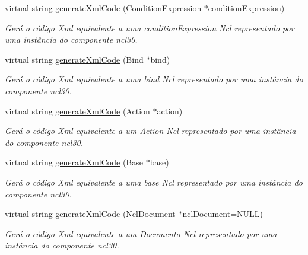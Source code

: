 \begin{DoxyCompactItemize}
virtual string \hyperlink{classbr_1_1ufscar_1_1lince_1_1ncl_1_1generator_1_1NclGenerator_a1c0a01534324eb9c5614b72391844cd5}{generateXmlCode} (ConditionExpression $\ast$conditionExpression)
\begin{DoxyCompactList}\small\item\em Gerá o código Xml equivalente a uma conditionExpression Ncl representado por uma instância do componente ncl30. \item\end{DoxyCompactList}\item 
virtual string \hyperlink{classbr_1_1ufscar_1_1lince_1_1ncl_1_1generator_1_1NclGenerator_abd146c724f44d5750a92979d8fe53b34}{generateXmlCode} (Bind $\ast$bind)
\begin{DoxyCompactList}\small\item\em Gerá o código Xml equivalente a uma bind Ncl representado por uma instância do componente ncl30. \item\end{DoxyCompactList}\item 
virtual string \hyperlink{classbr_1_1ufscar_1_1lince_1_1ncl_1_1generator_1_1NclGenerator_abc3c9219312ca8082cce41d6e1b5fc23}{generateXmlCode} (Action $\ast$action)
\begin{DoxyCompactList}\small\item\em Gerá o código Xml equivalente a um Action Ncl representado por uma instância do componente ncl30. \item\end{DoxyCompactList}\item 
virtual string \hyperlink{classbr_1_1ufscar_1_1lince_1_1ncl_1_1generator_1_1NclGenerator_aae7b4842e72b88deb5c5a303a77c7cab}{generateXmlCode} (Base $\ast$base)
\begin{DoxyCompactList}\small\item\em Gerá o código Xml equivalente a uma base Ncl representado por uma instância do componente ncl30. \item\end{DoxyCompactList}\item 
virtual string \hyperlink{classbr_1_1ufscar_1_1lince_1_1ncl_1_1generator_1_1NclGenerator_a1d6d619cdde5a146572c0f4a6beeae54}{generateXmlCode} (NclDocument $\ast$nclDocument=NULL)
\begin{DoxyCompactList}\small\item\em Gerá o código Xml equivalente a um Documento Ncl representado por uma instância do componente ncl30. \item\end{DoxyCompactList}\item 

\end{DoxyCompactItemize}

